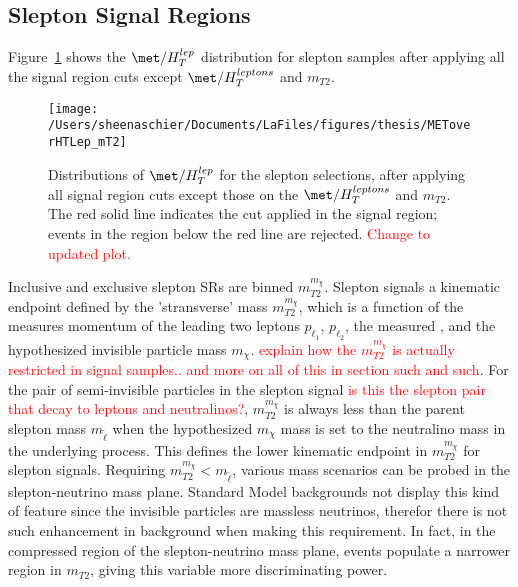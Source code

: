 \subsection{Slepton Signal Regions}
\label{sec:sr:mt2}
Figure~\ref{fig:METoverHTmt2} shows the $\met/H_{T}^{lep}$ distribution for slepton samples after applying all the signal region cuts except $\met/H_{T}^{leptons}$ and $m_{T2}$.
 \begin{figure}[tbp]
  \centering
  \texttt{[image: /Users/sheenaschier/Documents/LaFiles/figures/thesis/METoverHTLep\_mT2]}
 \caption{Distributions of $\met/H_{T}^{lep}$ for the slepton selections, after applying all signal region cuts except those on the $\met/H_{T}^{leptons}$ and $m_{T2}$.  The red solid line indicates the cut applied in the signal region; events in the region below the red line are rejected. \textcolor{red}{Change to updated plot.}}
 \label{fig:METoverHTmt2}
 \end{figure}
 
 Inclusive and exclusive slepton SRs are binned $m^{m_\chi}_{T2}$.  Slepton signals a kinematic endpoint defined by the 'stransverse' mass $m^{m_\chi}_{T2}$, which is a function of the measures momentum of the leading two leptons $p_{\ell_1}$, $p_{\ell_2}$, the measured \pt, and the hypothesized invisible particle mass $m_\chi$.  \textcolor{red}{explain how the $m^{m_\chi}_{T2}$ is actually restricted in signal samples.. and more on all of this in section such and such}.    For the pair of semi-invisible particles in the slepton signal \textcolor{red}{is this the slepton pair that decay to leptons and neutralinos?}, $m^{m_\chi}_{T2}$ is always less than the parent slepton mass $m_{\tilde\ell}$ when the hypothesized $m_\chi$ mass is set to the neutralino mass in the underlying process.  This defines the lower kinematic endpoint in $m^{m_\chi}_{T2}$ for slepton signals.  Requiring $m^{m_\chi}_{T2} < m_{\tilde\ell}$, various mass scenarios can be probed in the slepton-neutrino mass plane.  Standard Model backgrounds not display this kind of feature since the invisible particles are massless neutrinos, therefor there is not such enhancement in background when making this requirement.  In fact, in the compressed region of the slepton-neutrino mass  plane, events populate a narrower region in $m_{T2}$, giving this variable more discriminating power.  

